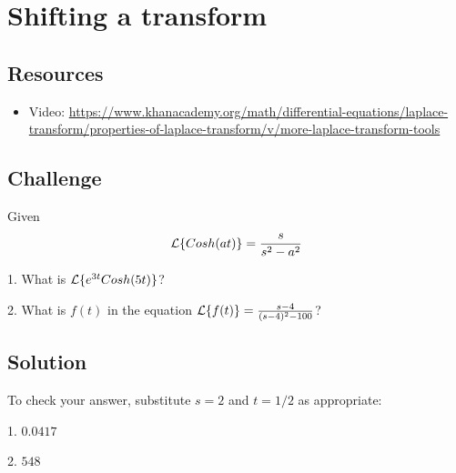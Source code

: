 \newpage
\section{Shifting a transform}

\subsection*{Resources}
\begin{itemize}
    \item Video: \url{https://www.khanacademy.org/math/differential-equations/laplace-transform/properties-of-laplace-transform/v/more-laplace-transform-tools} %
\end{itemize}

\subsection*{Challenge}
Given
\begin{equation}
    \mathcal{L}\{Cosh(at)\} = \frac{s}{s^2-a^2}
\end{equation}

1. What is $\mathcal{L}\{e^{3t} Cosh(5t)\}$?

2. What is $f(t)$ in the equation $\mathcal{L}\{f(t)\} = \frac{s-4}{(s-4)^2-100}$?

\subsection*{Solution}
To check your answer, substitute $s=2$ and $t=1/2$ as appropriate:

1. $0.0417$

2. $548$




